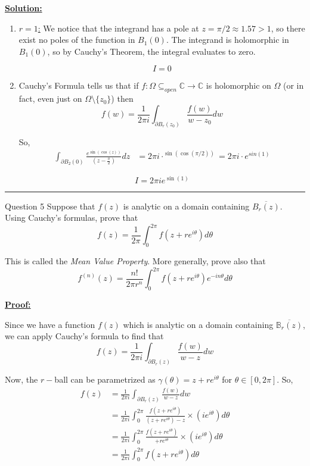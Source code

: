 \documentclass{article}
\newcommand{\C}{\mathbb{C}}
\begin{document}
\vskip 0.5cm
\underline{\textbf{Solution:}}

\vsize 0.5cm
\begin{enumerate}[label=(\alph*)]
  \item \underline{$r = 1$:} We notice that the integrand has a pole at $z = \pi/2 \approx 1.57 > 1$, so there exist no poles of the function in $B_1(0)$. The integrand is holomorphic in $B_1(0)$, so by Cauchy's Theorem, the integral evaluates to zero.
  
  \[ \boxed{I = 0} \]


  \vskip 0.5cm
  \item Cauchy's Formula tells us that if $f : \Omega \subseteq_{open} \C \rightarrow \C$ is holomorphic on $\Omega$ (or in fact, even just on $\Omega \setminus \{z_0\}$) then 
  \[ f(w) = \frac{1}{2\pi i} \int_{\partial B_r(z_0)} \frac{f(w)}{w - z_0} dw \]

  So, 
  \begin{align*}
    \int_{\partial B_2(0)} \frac{e^{\sin(\cos(z))}}{\left(z - \frac{\pi}{2}\right)} dz &= 2\pi i \cdot ^{\sin(\cos(\pi / 2))} = 2\pi i \cdot  e^{sin(1)}
  \end{align*}

  \[ \boxed{I = 2\pi i e^{\sin(1)}} \]
\end{enumerate}


\vskip 0.5cm
\hrule 
\vskip 0.5cm


\begin{mathdefinitionbox}{Question 5}
\vskip 0.5cm
Suppose that $f(z)$ is analytic on a domain containing $\overline{B_r(z)}$. Using Cauchy's formulas, prove that 
\[ f(z) = \frac{1}{2\pi} \int_{0}^{2\pi} f(z + re^{i\theta}) d\theta \]

This is called the \emph{Mean Value Property}. More generally, prove also that 
\[ f^{(n)}(z) = \frac{n!}{2\pi r^n} \int_0^{2\pi} f(z + re^{i\theta}) e^{-in\theta} d\theta \]
\end{mathdefinitionbox}

\vskip 0.5cm
\underline{\textbf{Proof:}}

Since we have a function $f(z)$ which is analytic on a domain containing $\overline{\mathbb{B}_r(z)}$, we can apply Cauchy's formula to find that 
\[ f(z) = \frac{1}{2\pi i} \int_{\partial B_r(z)} \frac{f(w)}{w - z} dw \]

Now, the $r-$ball can be parametrized as $\gamma(\theta) = z + re^{i\theta}$ for $\theta \in [0, 2\pi]$. So, 
\begin{align*}
  f(z) &= \frac{1}{2\pi i} \int_{\partial B_r(z)} \frac{f(w)}{w - z} dw \\
  &=\frac{1}{2\pi i} \int_{0}^{2 \pi} \frac{f(z + re^{i\theta})}{(z + re^{i\theta}) - z} \times \left( ie^{i\theta} \right) d\theta \\
  &=\frac{1}{2\pi i} \int_{0}^{2 \pi} \frac{f(z + re^{i\theta})}{+ re^{i\theta}} \times \left( ie^{i\theta} \right) d\theta \\
  &=\frac{1}{2\pi i} \int_{0}^{2 \pi}f(z + re^{i\theta})  d\theta 
\end{align*}
\end{document}
